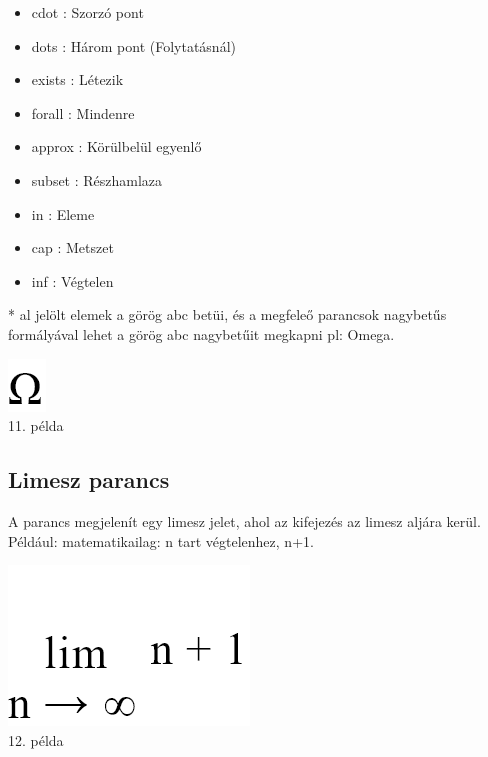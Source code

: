 \documentclass[../spec.tex]{subfiles}
\begin{document}
\begin{itemize}
        \item \tbs cdot : Szorzó pont
        \item \tbs dots : Három pont (Folytatásnál)
        \item \tbs exists : Létezik
        \item \tbs forall : Mindenre
        \item \tbs approx : Körülbelül egyenlő
        \item \tbs subset : Részhamlaza
        \item \tbs in : Eleme
        \item \tbs cap : Metszet
        \item \tbs inf : Végtelen
    \end{itemize}
    * al jelölt elemek a görög abc betüi, és a megfeleő parancsok nagybetűs formályával lehet a görög abc nagybetűit megkapni pl: \tbs Omega.

    \begin{center}
        \includegraphics[scale=0.4]{./images/doc11.png}\\
        11. példa
    \end{center}

    \subsection{Limesz parancs}\label{subsec:limesz-parancs}
    A  parancs megjelenít egy limesz jelet, ahol az  kifejezés az limesz aljára kerül.\\
    Például:  matematikailag: n tart végtelenhez, n+1.\\

    \begin{center}
        \includegraphics[scale=0.4]{./images/doc12.png}\\
        12. példa
    \end{center}
\end{document}
